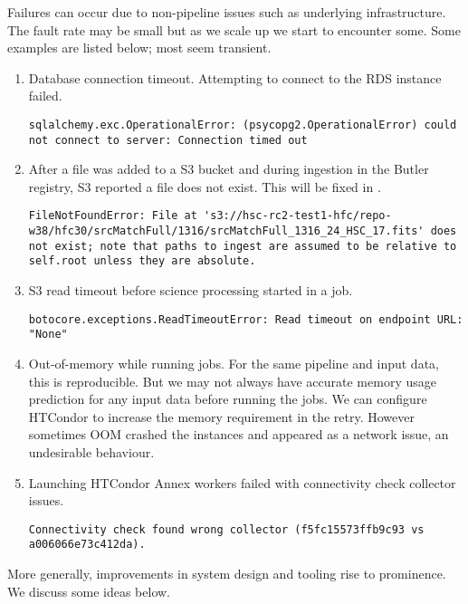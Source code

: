 Failures can occur due to non-pipeline issues such as underlying infrastructure.
The fault rate may be small but as we scale up we start to encounter some.
Some examples are listed below; most seem transient.


\begin{enumerate}
\item Database connection timeout. Attempting to connect to the RDS instance failed.
\begin{lstlisting}[breaklines=true]
sqlalchemy.exc.OperationalError: (psycopg2.OperationalError) could not connect to server: Connection timed out
\end{lstlisting}
\item
After a file was added to a S3 bucket and during ingestion in the Butler registry, S3 reported a file does not exist.
This will be fixed in .
\begin{lstlisting}[breaklines=true]
FileNotFoundError: File at 's3://hsc-rc2-test1-hfc/repo-w38/hfc30/srcMatchFull/1316/srcMatchFull_1316_24_HSC_17.fits' does not exist; note that paths to ingest are assumed to be relative to self.root unless they are absolute.
\end{lstlisting}
\item S3 read timeout before science processing started in a job.
\begin{lstlisting}[breaklines=true]
botocore.exceptions.ReadTimeoutError: Read timeout on endpoint URL: "None"
\end{lstlisting}
\item Out-of-memory while running jobs.
For the same pipeline and input data, this is reproducible.
But we may not always have accurate memory usage prediction for any input data before running the jobs.
We can configure HTCondor to increase the memory requirement in the retry.
However sometimes OOM crashed the instances and appeared as a network issue, an undesirable behaviour.
\item Launching HTCondor Annex workers failed with connectivity check collector issues.
\begin{lstlisting}[breaklines=true]
Connectivity check found wrong collector (f5fc15573ffb9c93 vs a006066e73c412da).
\end{lstlisting}
\end{enumerate}


More generally, improvements in system design and tooling rise to prominence.
We discuss some ideas below.


